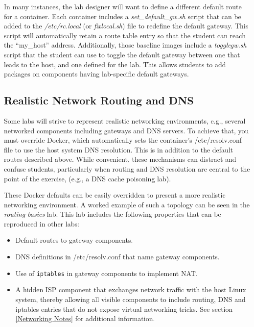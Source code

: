 \documentclass[12pt]{article}
\begin{document}
In many instances, the lab designer will want to define a different default route for a 
container.  Each container includes a \textit{set\_default\_gw.sh}
script that can be added to the \textit{/etc/rc.local} (or \textit{fixlocal.sh}) file to redefine the default gateway.
This script will automatically retain a route table entry so that the student can reach the ``my\_host''
address.  Additionally, those baseline images include a \textit{togglegw.sh} script that the student
can use to toggle the default gateway between one that leads to the host, and one defined for the lab.
This allows students to add packages on components having lab-specific default gateways.

\subsection{Realistic Network Routing and DNS}
Some labs will strive to represent realistic networking environments, 
e.g., several networked components including gateways and DNS servers.
To achieve that, you must override Docker, which automatically sets 
the container's /etc/resolv.conf file to use the
host system DNS resolution.  This is in addition to the default routes described
above.  While convenient, these mechanisms can distract and confuse students, particularly
when routing and DNS resolution are central to the point of the exercise, (e.g.,
a DNS cache poisoning lab).

These Docker defaults can be easily overridden to present a more realistic networking
environment.  A worked example of such a topology can be seen in the \textit{routing-basics} lab.
This lab includes the following properties that can be reproduced in other labs:
\begin{itemize}
\item Default routes to gateway components.
\item DNS definitions in /etc/resolv.conf that name gateway components.
\item Use of \texttt{iptables} in gateway components to implement NAT.
\item A hidden ISP component that exchanges network traffic with the host Linux system,
thereby allowing all visible components to include routing, DNS and iptables entries that do not
expose virtual networking tricks.  See section \ref{Networking Notes} for additional information.

\end{itemize}
\end{document}
